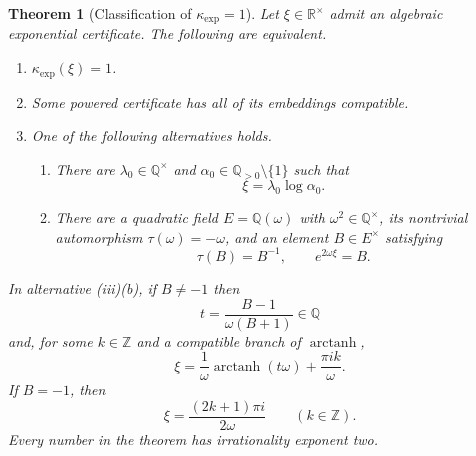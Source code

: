 \documentclass[11pt]{article}
\newcommand{\RR}{\mathbb R}
\newcommand{\QQ}{\mathbb Q}
\newcommand{\ZZ}{\mathbb Z}
\DeclareMathOperator{\arctanh}{arctanh}
\newtheorem{theorem}{Theorem}[section]
\theoremstyle{definition}
\theoremstyle{remark}
\numberwithin{equation}{section}
\begin{document}
\begin{theorem}[Classification of $\kappa_{\exp}=1$]
\label{thm:kappa-one-classification}
Let $\xi\in\RR^\times$ admit an algebraic exponential certificate.  The
following are equivalent.
\begin{enumerate}[label=\textup{(\roman*)}]
\item $\kappa_{\exp}(\xi)=1$.
\item Some powered certificate has all of its embeddings compatible.
\item One of the following alternatives holds.
  \begin{enumerate}[label=\textup{(\alph*)}]
  \item There are $\lambda_0\in\QQ^\times$ and
  $\alpha_0\in\QQ_{>0}\setminus\{1\}$ such that
  \[
    \xi=\lambda_0\log\alpha_0.
  \]
  \item There are a quadratic field $E=\QQ(\omega)$ with
  $\omega^2\in\QQ^\times$, its nontrivial automorphism
  $\tau(\omega)=-\omega$, and an element $B\in E^\times$ satisfying
  \[
    \tau(B)=B^{-1},
    \qquad
    e^{2\omega\xi}=B.
  \]
  \end{enumerate}
\end{enumerate}
In alternative \textup{(iii)(b)}, if $B\ne-1$ then
\[
 t=\frac{B-1}{\omega(B+1)}\in\QQ
\]
and, for some $k\in\ZZ$ and a compatible branch of $\arctanh$,
\begin{equation}\label{eq:artanh-parametrization}
 \boxed{
 \xi=\frac1\omega\arctanh(t\omega)
      +\frac{\pi i k}{\omega}.}
\end{equation}
If $B=-1$, then
\begin{equation}\label{eq:torsion-boundary}
 \boxed{
 \xi=\frac{(2k+1)\pi i}{2\omega}}
 \qquad(k\in\ZZ).
\end{equation}
Every number in the theorem has irrationality exponent two.
\end{theorem}
\end{document}
